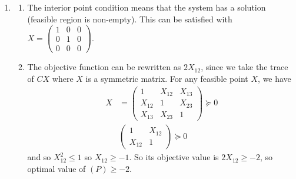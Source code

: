 \begin{enumerate}
\begin{enumerate}[label=(\arabic*)]
                    For reverse, since \(x \in C_1^* \cap C_2^*\) then \(\langle x, c_1\rangle \geq 0\) and \(\langle x, c_2 \rangle \geq 0\). Summing these equations gives the result.
          \end{enumerate}
    \item \begin{enumerate}[label=(\arabic*)]
              \item The interior point condition means that the system has a solution (feasible region is non-empty). This can be satisfied with \(X = \begin{pmatrix}
                        1 & 0 & 0 \\
                        0 & 1 & 0 \\
                        0 & 0 & 0
                    \end{pmatrix}\).
              \item The objective function can be rewritten as \(2X_{12}\), since we take the trace of \(CX\) where \(X\) is a symmetric matrix. For any feasible point \(X\), we have
                    \begin{align*}
                        X & = \begin{pmatrix}
                            1      & X_{12} & X_{13} \\
                            X_{12} & 1      & X_{23} \\
                            X_{13} & X_{23} & 1
                        \end{pmatrix} \succeq 0 \\
                          & \begin{pmatrix}
                            1      & X_{12} \\
                            X_{12} & 1
                        \end{pmatrix} \succeq 0
                    \end{align*}
                    and so \(X_{12}^2 \leq 1\) so \(X_{12} \geq -1\). So its objective value is \(2X_{12} \geq -2\), so optimal value of \((P) \geq -2\).  \\


\end{enumerate}
\end{enumerate}

